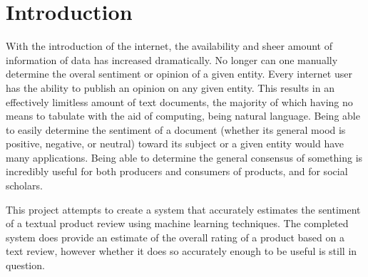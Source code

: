 \section{Introduction}
With the introduction of the internet, the availability and sheer amount of information of data has increased dramatically. No longer can one manually determine the overal sentiment or opinion of a given entity. Every internet user has the ability to publish an opinion on any given entity. This results in an effectively limitless amount of text documents, the majority of which having no means to tabulate with the aid of computing, being natural language. Being able to easily determine the sentiment of a document (whether its general mood is positive, negative, or neutral) toward its subject or a given entity would have many applications. Being able to determine the general consensus of something is incredibly useful for both producers and consumers of products, and for social scholars.

This project attempts to create a system that accurately estimates the sentiment of a textual product review using machine learning techniques. The completed system does provide an estimate of the overall rating of a product based on a text review, however whether it does so accurately enough to be useful is still in question. 
